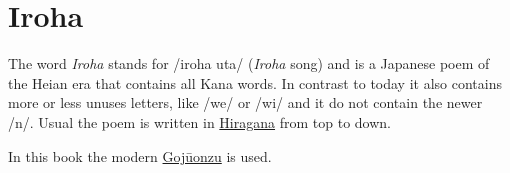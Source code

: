 \section{Iroha} 
\label{sec:Iroha}

The word \textit{Iroha} stands for /iroha uta/ (\textit{Iroha} song) and is a
Japanese poem of the Heian era that contains all Kana words.  In contrast to
today it also contains more or less unuses letters, like /we/ or /wi/ and it do
not contain the newer /n/. Usual the poem is written in
\hyperref[sec:Hiragana]{Hiragana} from top to down.

\begin{center}
\end{center}

In this book the modern \hyperref[sec:Gojuonzu]{Gojūonzu} is used.

